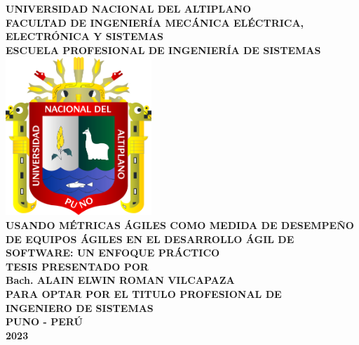 \textbf{\Large UNIVERSIDAD NACIONAL DEL ALTIPLANO}\\
\vspace{0.5cm}
\textbf{\Large FACULTAD DE INGENIERÍA MECÁNICA ELÉCTRICA, ELECTRÓNICA Y SISTEMAS}\\
\vspace{0.5cm}
\textbf{\large ESCUELA PROFESIONAL DE INGENIERÍA DE SISTEMAS}\\
\vspace{1cm}
\includegraphics[width=5.5cm]{chapters/utils/logo-unap.png}\\
\vspace{1cm}
\textbf{\large USANDO MÉTRICAS ÁGILES COMO MEDIDA DE DESEMPEÑO DE EQUIPOS ÁGILES EN EL DESARROLLO ÁGIL DE SOFTWARE: UN ENFOQUE PRÁCTICO}\\
\vspace{0.8cm}
\textbf{\large TESIS PRESENTADO POR}\\
\vspace{0.8cm}
\textbf{\Large Bach. ALAIN ELWIN ROMAN VILCAPAZA}\\
\vspace{0.8cm}
\textbf{\large PARA OPTAR POR EL TITULO PROFESIONAL DE}\\
\vspace{0.8cm}
\textbf{\Large INGENIERO DE SISTEMAS}\\
\vspace{0.8cm}
\textbf{\large PUNO - PERÚ}\\
\vspace{0.8cm}
\textbf{\large 2023}\\